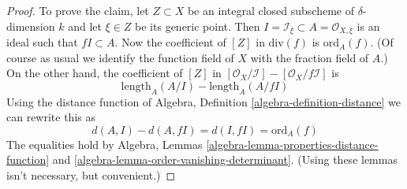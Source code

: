 \begin{proof}
\medskip\noindent
To prove the claim, let $Z \subset X$ be an integral closed subscheme
of $\delta$-dimension $k$ and let $\xi \in Z$ be its generic point.
Then $I = \mathcal{I}_\xi \subset A = \mathcal{O}_{X, \xi}$
is an ideal such that $fI \subset A$. Now the coefficient of
$[Z]$ in $\text{div}(f)$ is $\text{ord}_A(f)$. (Of course as usual
we identify the function field of $X$ with the fraction field of $A$.)
On the other hand, the coefficient of $[Z]$ in
$[\mathcal{O}_X/\mathcal{I}] - [\mathcal{O}_X/f\mathcal{I}]$
is
$$
\text{length}_A(A/I) - \text{length}_A(A/fI)
$$
Using the distance function of
Algebra, Definition \ref{algebra-definition-distance}
we can rewrite this as
$$
d(A, I) - d(A, fI) = d(I, fI) = \text{ord}_A(f)
$$
The equalities hold by Algebra, Lemmas
\ref{algebra-lemma-properties-distance-function} and
\ref{algebra-lemma-order-vanishing-determinant}.
(Using these lemmas isn't necessary, but convenient.)
\end{proof}